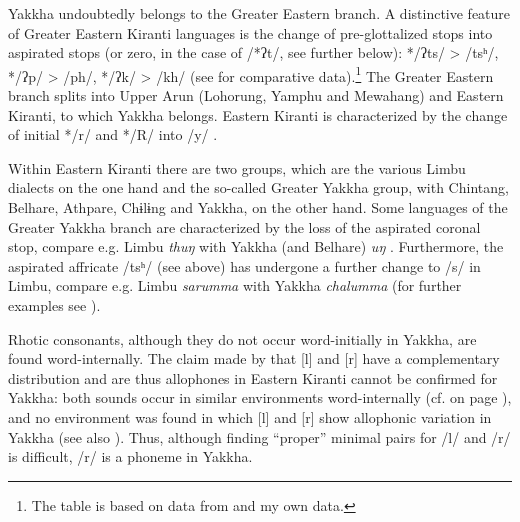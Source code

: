  
Yakkha undoubtedly belongs to the Greater Eastern branch. A distinctive feature of Greater Eastern Kiranti languages is the change of pre-glottalized stops into aspirated stops  (or zero, in the case of /*ʔt/, see further below):  */ʔts/ > /tsʰ/, */ʔp/ > /ph/,  */ʔk/ > /kh/ (see  for comparative data).\footnote{The table is based on data from \citet{Driem1993A-grammar, Driem1987A-grammar, Bickeletal2009Puma, Kongren2007Yakkha} and my own data.} The Greater Eastern branch splits into Upper Arun (Lohorung, Yamphu and Mewahang) and Eastern Kiranti, to which Yakkha belongs. Eastern Kiranti is characterized by  the change of  initial */r/ and */R/ into /y/ \citep{Driem1990The-fall}.

Within Eastern Kiranti there are two groups, which are the various Limbu dialects on the one hand and the so-called Greater Yakkha group, with Chintang, Belhare, Athpare,  Chɨlɨng and Yakkha, on the other hand. Some languages of the Greater Yakkha branch are characterized by the loss of the aspirated coronal stop, compare e.g. Limbu \emph{thuŋ}  with Yakkha (and Belhare) \emph{uŋ} \citep{Bickel1997Dictionary}. Furthermore, the aspirated affricate /tsʰ/ (see above) has undergone a further change to /s/ in Limbu, compare e.g. Limbu \emph{sarumma} with Yakkha \emph{chalumma}  (for further examples see ). 

Rhotic consonants, although they do  not occur word-initially  in Yakkha, are found word-internally. The claim made by  \citet{Driem1990The-fall} that [l] and [r] have a complementary distribution and are thus allophones in Eastern Kiranti cannot be confirmed for Yakkha: both sounds occur in similar environments word-internally  (cf.   on page \pageref{r-l}), and no environment was found  in which [l] and [r] show allophonic variation  in Yakkha  (see also ). Thus, although finding “proper” minimal pairs for /l/ and /r/ is difficult, /r/ is a phoneme in Yakkha.

